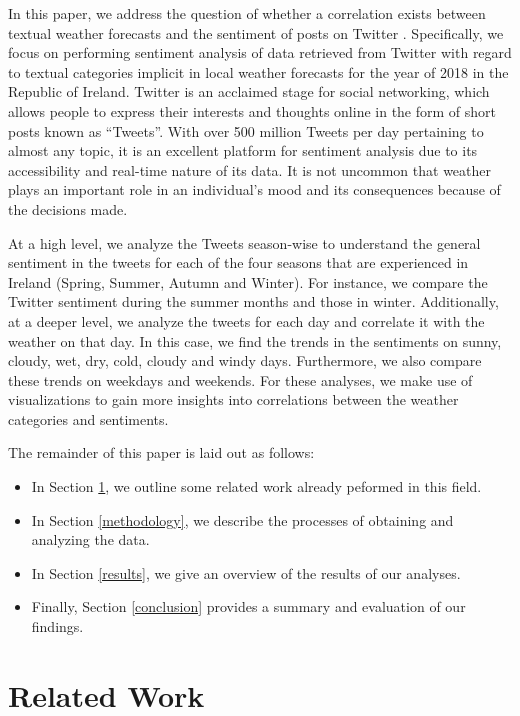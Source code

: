 \documentclass[a4paper,10pt]{article}
\begin{document}
    
    In this paper, we address the question of whether a correlation exists between textual weather forecasts and the sentiment of posts on Twitter . Specifically, we focus on performing sentiment analysis of data retrieved from Twitter with regard to textual categories implicit in local weather forecasts for the year of 2018 in the Republic of Ireland. 
    Twitter is an acclaimed stage for social networking, which allows people to express their interests and thoughts online in the form of short posts known as “Tweets”. With over 500 million Tweets per day pertaining to almost any topic, it is an excellent platform for sentiment analysis due to its accessibility and real-time nature of its data. It is not uncommon that weather plays an important role in an individual’s mood and its consequences because of the decisions made. 
    
    At a high level, we analyze the Tweets season-wise to understand the general sentiment in the tweets for each of the four seasons that are experienced in Ireland (Spring, Summer, Autumn and Winter). For instance, we compare the Twitter sentiment during the summer months and those in winter. Additionally, at a deeper level, we analyze the tweets for each day and correlate it with the weather on that day. In this case, we find the trends in the sentiments on sunny, cloudy, wet, dry, cold, cloudy and windy days. Furthermore, we also compare these trends on weekdays and weekends. For these analyses, we make use of visualizations to gain more insights into correlations between the weather categories and sentiments.

    The remainder of this paper is laid out as follows:
    \begin{itemize}
        \item{In Section \ref{related_work}, we outline some related work already peformed in this field.}
        \item{In Section \ref{methodology}, we describe the processes of obtaining and analyzing the data.}
        \item{In Section \ref{results}, we give an overview of the results of our analyses.}
        \item{Finally, Section \ref{conclusion} provides a summary and evaluation of our findings.}
    \end{itemize}


    \section{Related Work}
    \label{related_work}
\end{document}
